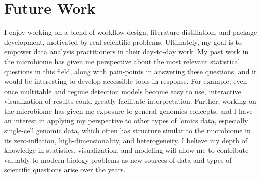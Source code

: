\documentclass{article}
\begin{document}
\section{Future Work}

I enjoy working on a blend of workflow design, literature distillation, and
package development, motivated by real scientific problems. Ultimately, my goal
is to empower data analysis practitioners in their day-to-day work. My past work
in the microbiome has given me perspective about the most relevant statistical
questions in this field, along with pain-points in answering these questions,
and it would be interesting to develop accessible tools in response. For
example, even once multitable and regime detection models become easy to use,
interactive visualization of results could greatly facilitate interpretation.
Further, working on the microbiome has given me exposure to general genomics
concepts, and I have an interest in applying my perspective to other types of
'omics data, especially single-cell genomic data, which often has structure
similar to the microbiome in its zero-inflation, high-dimensionality, and
heterogeneity. I believe my depth of knowledge in statistics, visualization, and
modeling will allow me to contribute valuably to modern biology problems as new
sources of data and types of scientific questions arise over the years.



\end{document}

